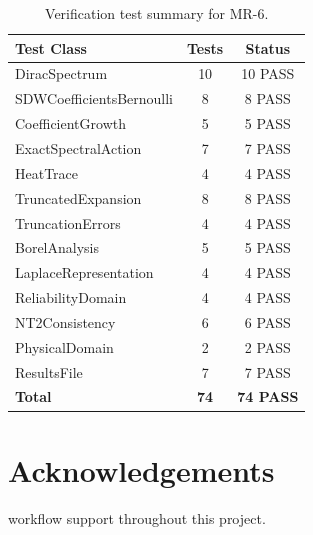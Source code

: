 \documentclass[11pt,a4paper]{article}
\theoremstyle{plain}
\theoremstyle{definition}
\begin{document}
\begin{table}[h]
\centering
\begin{tabular}{lcc}
\toprule
Test Class & Tests & Status \\
\midrule
DiracSpectrum & 10 & 10 PASS \\
SDWCoefficientsBernoulli & 8 & 8 PASS \\
CoefficientGrowth & 5 & 5 PASS \\
ExactSpectralAction & 7 & 7 PASS \\
HeatTrace & 4 & 4 PASS \\
TruncatedExpansion & 8 & 8 PASS \\
TruncationErrors & 4 & 4 PASS \\
BorelAnalysis & 5 & 5 PASS \\
LaplaceRepresentation & 4 & 4 PASS \\
ReliabilityDomain & 4 & 4 PASS \\
NT2Consistency & 6 & 6 PASS \\
PhysicalDomain & 2 & 2 PASS \\
ResultsFile & 7 & 7 PASS \\
\midrule
\textbf{Total} & \textbf{74} & \textbf{74 PASS} \\
\bottomrule
\end{tabular}
\caption{Verification test summary for MR-6.}
\label{tab:tests}
\end{table}


\section*{Acknowledgements}

workflow support throughout this project.
\end{document}
